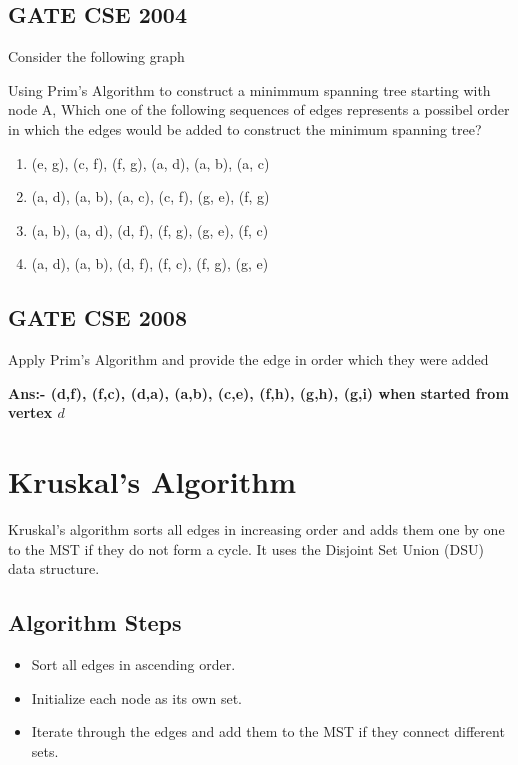 \documentclass[a4paper,14pt]{extarticle}
\begin{document}
\subsection{GATE CSE 2004}
Consider the following graph



Using Prim's Algorithm to construct a minimmum spanning tree starting with node A, Which
one of the following sequences of edges represents a possibel order in which
the edges would be added to construct the minimum spanning tree?

\begin{enumerate}[label=(\alph*)]
    \item (e, g), (c, f), (f, g), (a, d), (a, b), (a, c)
    \item (a, d), (a, b), (a, c), (c, f), (g, e), (f, g)
    \item (a, b), (a, d), (d, f), (f, g), (g, e), (f, c)
    \item (a, d), (a, b), (d, f), (f, c), (f, g), (g, e)
\end{enumerate}

\newpage
\subsection{GATE CSE 2008}
Apply Prim's Algorithm and provide the edge in order which they were added



\textbf{Ans:- (d,f), (f,c), (d,a), (a,b), (c,e), (f,h), (g,h), (g,i) when started from vertex $d$}

\newpage
\section{Kruskal's Algorithm} 

Kruskal's\cite{kruskal1956} algorithm sorts all edges in increasing order and adds them one by one to the MST if 
they do not form a cycle. It uses the Disjoint Set Union (DSU\cite{tarjan1975}) data structure.

\subsection{Algorithm Steps}
\begin{itemize}
    \item Sort all edges in ascending order.
    \item Initialize each node as its own set.
    \item Iterate through the edges and add them to the MST if they connect different sets.
\end{itemize}
\end{document}
